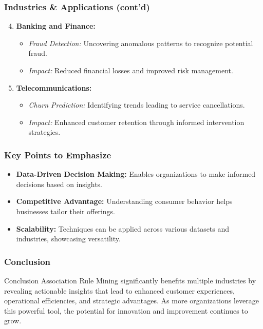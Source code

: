 \documentclass{beamer}
\begin{document}
\begin{frame}[fragile]
    \frametitle{Industries \& Applications (cont'd)}
    \begin{enumerate}
        \setcounter{enumi}{3} %
        
        \item \textbf{Banking and Finance:}
            \begin{itemize}
                \item \textit{Fraud Detection:} Uncovering anomalous patterns to recognize potential fraud.
                \item \textit{Impact:} Reduced financial losses and improved risk management.
            \end{itemize}
        
        \item \textbf{Telecommunications:}
            \begin{itemize}
                \item \textit{Churn Prediction:} Identifying trends leading to service cancellations.
                \item \textit{Impact:} Enhanced customer retention through informed intervention strategies.
            \end{itemize}
    \end{enumerate}
\end{frame}

\begin{frame}[fragile]
    \frametitle{Key Points to Emphasize}
    \begin{itemize}
        \item \textbf{Data-Driven Decision Making:} Enables organizations to make informed decisions based on insights.
        \item \textbf{Competitive Advantage:} Understanding consumer behavior helps businesses tailor their offerings.
        \item \textbf{Scalability:} Techniques can be applied across various datasets and industries, showcasing versatility.
    \end{itemize}
\end{frame}

\begin{frame}[fragile]
    \frametitle{Conclusion}
    \begin{block}{Conclusion}
        Association Rule Mining significantly benefits multiple industries by revealing actionable insights that lead to enhanced customer experiences, operational efficiencies, and strategic advantages. As more organizations leverage this powerful tool, the potential for innovation and improvement continues to grow.
    \end{block}
\end{frame}
\end{document}
